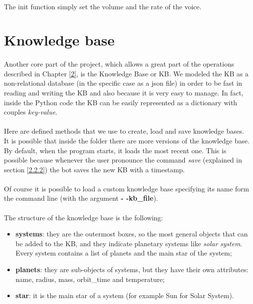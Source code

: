 \documentclass[12pt, a4paper]{article}
\begin{document}
\paragraph{}
The init function simply set the volume and the rate of the voice.

\section{Knowledge base}
\paragraph{}
Another core part of the project, which allows a great part of the operations described in Chapter \ref{2}, is the Knowledge Base or KB.
We modeled the KB as a non-relational database (in the specific case as a json file) in order to be fast in reading and writing the KB and also because it is very easy to manage. In fact, inside the Python code the KB can be easily represented as a dictionary with couples \textit{key-value}.
\paragraph{}
Here are defined methods that we use to create, load and save knowledge bases. It is possible that inside the folder there are more versions of the knowledge base. By default, when the program starts, it loads the most recent one. This is possible because whenever the user pronounce the command \textit{save} (explained in section \ref{2.2.2}) the bot saves the new KB with a timestamp. 
\paragraph{}
Of course it is possible to load a custom knowledge base specifying its name form the command line (with the argument \textbf{- -kb\_file}).
\paragraph{}
The structure of the knowledge base is the following:
\begin{itemize}
\item \textbf{systems}: they are the outermost boxes, so the most general objects that can be added to the KB, and they indicate planetary systems like \textit{solar system}. Every system contains a list of planets and the main star of the system;
\item \textbf{planets}: they are sub-objects of systems, but they have their own attributes: name, radius, mass, orbit\_time and temperature;
\item \textbf{star}: it is the main star of a system (for example Sun for Solar System).
\end{itemize}
\end{document}

